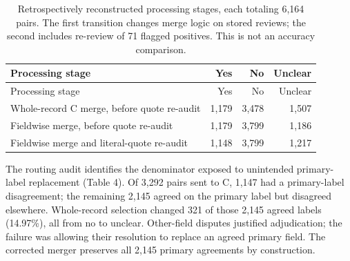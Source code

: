 \documentclass[10pt]{article}
\begin{document}
\begin{longtable}[]{@{}lrrr@{}}
\caption{Retrospectively reconstructed processing stages, each totaling 6,164 pairs. The first transition changes merge logic on stored reviews; the second includes re-review of 71 flagged positives. This is not an accuracy comparison.}\tabularnewline
\toprule\noalign{}
Processing stage & Yes & No & Unclear \\
\midrule\noalign{}
\endfirsthead
\toprule\noalign{}
Processing stage & Yes & No & Unclear \\
\midrule\noalign{}
\endhead
\bottomrule\noalign{}
\endlastfoot
Whole-record C merge, before quote re-audit & 1,179 & 3,478 & 1,507 \\
Fieldwise merge, before quote re-audit & 1,179 & 3,799 & 1,186 \\
Fieldwise merge and literal-quote re-audit & 1,148 & 3,799 & 1,217 \\
\end{longtable}

The routing audit identifies the denominator exposed to unintended primary-label replacement (Table 4). Of 3,292 pairs sent to C, 1,147 had a primary-label disagreement; the remaining 2,145 agreed on the primary label but disagreed elsewhere. Whole-record selection changed 321 of those 2,145 agreed labels (14.97\%), all from no to unclear. Other-field disputes justified adjudication; the failure was allowing their resolution to replace an agreed primary field. The corrected merger preserves all 2,145 primary agreements by construction.
\end{document}
